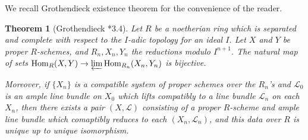 \documentclass{amsart}
\numberwithin{equation}{subsection}
\newtheorem{theorem}{Theorem}
\numberwithin{theorem}{section}
\theoremstyle{definition}
\theoremstyle{remark}
\DeclareMathOperator{\Hom}{Hom}
\begin{document}
We recall Grothendieck existence theorem for the convenience of the reader. 
\begin{theorem}[Grothendieck  \cite{MR2083211}*{3.4}]\label{thm:Grothendieckexistence}
    Let $R$ be a noetherian ring which is separated and complete with respect to the $I$-adic topology for an ideal $I$. Let $X$ and $Y$ be proper $R$-schemes, and $R_n, X_n, Y_n$ the reductions modulo $I^{n+1}$. The natural map of sets $\Hom_R(X,Y)\to \varprojlim \Hom_{R_n} (X_n, Y_n)$ is bijective. 

    Moreover, if $\{X_n\}$ is a compatible system of proper schemes over the $R_n$'s and $\mathscr{L}_0$ is an ample line bundle on $X_0$ which lifts compatibly to a line bundle $\mathscr{L}_n$ on each $X_n$, then there exists a pair $(X, \mathscr{L})$ consisting of a proper $R$-scheme and ample line bundle which comaptibly reduces to each $(X_n, \mathscr{L}_n)$, and this data over $R$ is unique up to unique isomorphism. 
\end{theorem}
\end{document}
